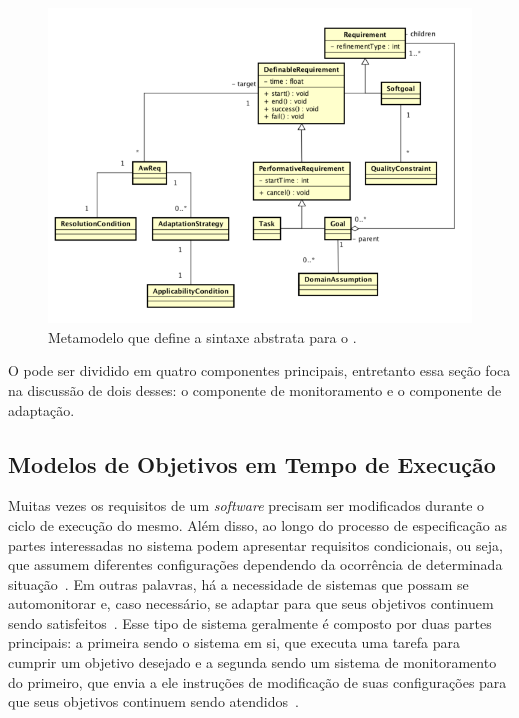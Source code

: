 \begin{figure}
	\centering
	\includegraphics[width=1\textwidth]{figuras/metamodelos/metamodelo-zanshin-antigo.png}
	\caption{Metamodelo que define a sintaxe abstrata para o \zanshin.}
	\label{figura-metamodelo-antigo}
\end{figure}

O \zanshin pode ser dividido em quatro componentes principais, entretanto essa seção foca na discussão de dois desses: o componente de monitoramento e o componente de adaptação.


\subsection{Modelos de Objetivos em Tempo de Execução}
\label{sec-referencial-engenharia-objetivos-runtime}

Muitas vezes os requisitos de um \textit{software} precisam ser modificados durante o ciclo de execução do mesmo. Além disso, ao longo do processo de especificação as partes interessadas no sistema podem apresentar requisitos condicionais, ou seja, que assumem diferentes configurações dependendo da ocorrência de determinada situação~\cite{souza2012requirement}. Em outras palavras, há a necessidade de sistemas que possam se automonitorar e, caso necessário, se adaptar para que seus objetivos continuem sendo satisfeitos~\cite{dalpiaz2013runtime}. Esse tipo de sistema geralmente é composto por duas partes principais: a primeira sendo o sistema em si, que executa uma tarefa para cumprir um objetivo desejado e a segunda sendo um sistema de monitoramento do primeiro, que envia a ele instruções de modificação de suas configurações para que seus objetivos continuem sendo atendidos~\cite{souza2013awareness}. 


